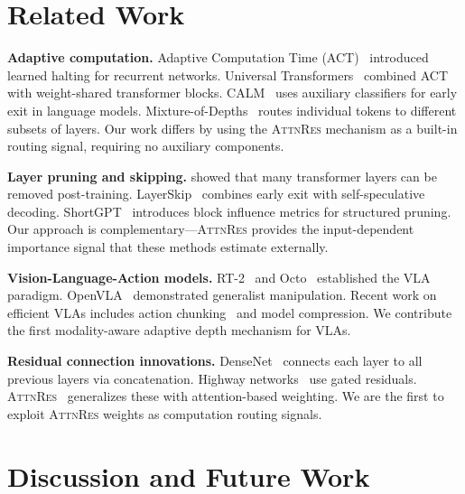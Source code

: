 \documentclass{article}
\newcommand{\attnres}{\textsc{AttnRes}}
\begin{document}
\section{Related Work}
\label{sec:related}

\textbf{Adaptive computation.} Adaptive Computation Time (ACT)~\citep{graves2016adaptive} introduced learned halting for recurrent networks. Universal Transformers~\citep{dehghani2018universal} combined ACT with weight-shared transformer blocks. CALM~\citep{schuster2022confident} uses auxiliary classifiers for early exit in language models. Mixture-of-Depths~\citep{raposo2024mixture} routes individual tokens to different subsets of layers. Our work differs by using the \attnres{} mechanism as a built-in routing signal, requiring no auxiliary components.

\textbf{Layer pruning and skipping.} \citet{gromov2024unreasonable} showed that many transformer layers can be removed post-training. LayerSkip~\citep{elhoushi2024layerskip} combines early exit with self-speculative decoding. ShortGPT~\citep{men2024shortgpt} introduces block influence metrics for structured pruning. Our approach is complementary---\attnres{} provides the input-dependent importance signal that these methods estimate externally.

\textbf{Vision-Language-Action models.} RT-2~\citep{brohan2023rt} and Octo~\citep{team2024octo} established the VLA paradigm. OpenVLA~\citep{kim2024openvla} demonstrated generalist manipulation. Recent work on efficient VLAs includes action chunking~\citep{zhao2023learning} and model compression. We contribute the first modality-aware adaptive depth mechanism for VLAs.

\textbf{Residual connection innovations.} DenseNet~\citep{huang2017densely} connects each layer to all previous layers via concatenation. Highway networks~\citep{srivastava2015highway} use gated residuals. \attnres{}~\citep{chen2026attnres} generalizes these with attention-based weighting. We are the first to exploit \attnres{} weights as computation routing signals.

\section{Discussion and Future Work}
\label{sec:discussion}
\end{document}
